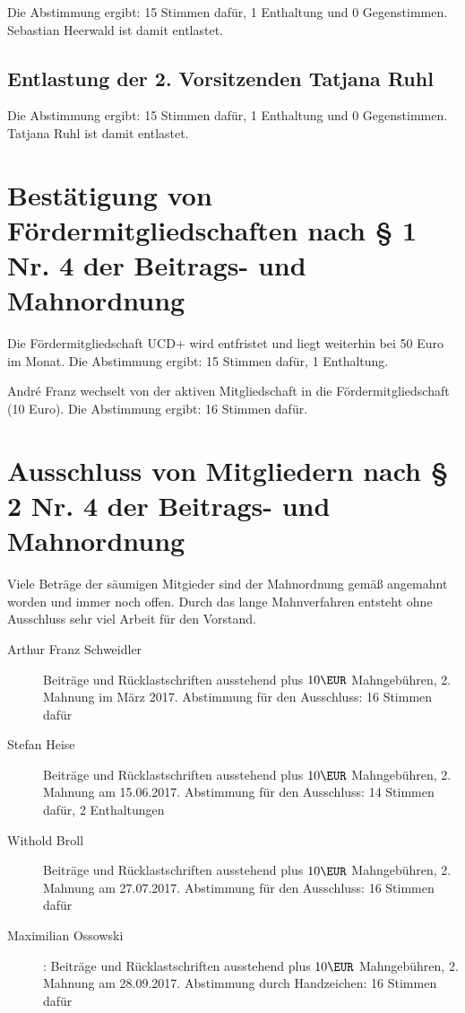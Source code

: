\documentclass[a4paper,12pt,titlepage]{scrartcl}
\begin{document}
Die Abstimmung ergibt: 15 Stimmen dafür, 1 Enthaltung und 0 Gegenstimmen. Sebastian Heerwald ist damit entlastet.

\subsection{Entlastung der 2. Vorsitzenden Tatjana Ruhl}
Die Abstimmung ergibt: 15 Stimmen dafür, 1 Enthaltung und 0 Gegenstimmen. Tatjana Ruhl ist damit entlastet.

\section{Bestätigung von Fördermitgliedschaften nach § 1 Nr. 4 der Beitrags- und Mahnordnung}

Die Fördermitgliedschaft UCD+ wird entfristet und liegt weiterhin bei 50 Euro im Monat.
Die Abstimmung ergibt: 15 Stimmen dafür, 1 Enthaltung.

André Franz wechselt von der aktiven Mitgliedschaft in die Fördermitgliedschaft (10 Euro). Die Abstimmung ergibt: 16 Stimmen dafür.

\section{ Ausschluss von Mitgliedern nach § 2 Nr. 4 der Beitrags- und Mahnordnung }

Viele Beträge der säumigen Mitgieder sind der Mahnordnung gemäß angemahnt worden und immer noch offen. Durch das lange Mahnverfahren entsteht ohne Ausschluss sehr viel Arbeit für den Vorstand.

\begin{description}

\item[Arthur Franz Schweidler] Beiträge und Rücklastschriften ausstehend plus $10\EUR$ Mahngebühren, 2. Mahnung im März 2017. Abstimmung für den Ausschluss: 16 Stimmen dafür
\item[Stefan Heise] Beiträge und Rücklastschriften ausstehend plus $10\EUR$ Mahngebühren, 2. Mahnung am 15.06.2017. Abstimmung für den Ausschluss: 14 Stimmen dafür, 2 Enthaltungen
\item[Withold Broll] Beiträge und Rücklastschriften ausstehend plus $10\EUR$ Mahngebühren, 2. Mahnung am 27.07.2017. Abstimmung für den Ausschluss: 16 Stimmen dafür
\item[Maximilian Ossowski]: Beiträge und Rücklastschriften ausstehend plus $10\EUR$ Mahngebühren, 2. Mahnung am 28.09.2017. Abstimmung durch Handzeichen: 16 Stimmen dafür
\end{description}
\end{document}
